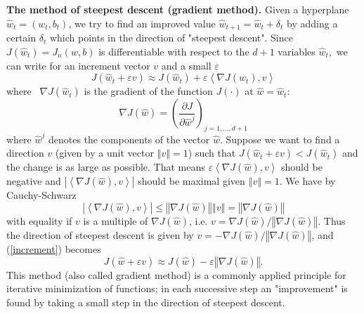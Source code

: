 \documentclass[11pt,twoside]{article}%
\theoremstyle{change}
\begin{document}
\textbf{The method of steepest descent (gradient method).} Given a hyperplane
$\hat{w}_{t}=\left(  w_{t},b_{t}\right)  $, we try to find an improved value
$\hat{w}_{t+1}=\hat{w}_{t}+\delta_{t}$ by adding a certain $\delta_{t}$ which
points in the direction of "steepest descent". Since $J(\hat{w}_{t}%
)=J_{n}(w,b)$ is differentiable with respect to the $d+1$ variables $\hat
{w}_{t},$ we can write for an increment vector $v$ and a small $\varepsilon$
\begin{equation}
J(\hat{w}_{t}+\varepsilon v)\approx J(\hat{w}_{t})+\varepsilon\left\langle
\nabla J(\hat{w}_{t}),v\right\rangle \label{increment}%
\end{equation}
where \ $\nabla J(\hat{w}_{t})$ is the gradient of the function $J(\cdot)$ at
$\hat{w}=\hat{w}_{t}$:%
\[
\nabla J(\hat{w})=\left(  \frac{\partial J}{\partial\hat{w}^{j}}\right)
_{j=1,\ldots,d+1}%
\]
where $\hat{w}^{j}$ denotes the components of the vector $\hat{w}$. Suppose we
want to find a direction $v$ (given by a unit vector $\left\Vert v\right\Vert
=1$) such that $J(\hat{w}_{t}+\varepsilon v)<J(\hat{w}_{t})$ and the change is
as large as possible. That means $\varepsilon\left\langle \nabla J(\hat
{w}),v\right\rangle $ should be negative and $\left\vert \left\langle \nabla
J(\hat{w}),v\right\rangle \right\vert $ should be maximal given $\left\Vert
v\right\Vert =1$. We have by Cauchy-Schwarz
\[
\left\vert \left\langle \nabla J(\hat{w}),v\right\rangle \right\vert
\leq\left\Vert \nabla J(\hat{w})\right\Vert \left\Vert v\right\Vert
=\left\Vert \nabla J(\hat{w})\right\Vert
\]
with equality if $v$ is a multiple of $\nabla J(\hat{w})$, i.e. $v=\nabla
J(\hat{w})/\left\Vert \nabla J(\hat{w})\right\Vert .$ Thus the direction of
steepest descent is given by $v=-\nabla J(\hat{w})/\left\Vert \nabla J(\hat
{w})\right\Vert $, and (\ref{increment}) becomes
\[
J(\hat{w}+\varepsilon v)\approx J(\hat{w})-\varepsilon\left\Vert \nabla
J(\hat{w})\right\Vert .
\]
This method (also called gradient method) is a commonly applied principle for
iterative minimization of functions; in each successive step an "improvement"
is found by taking a small step in the direction of steepest descent.
\end{document}
